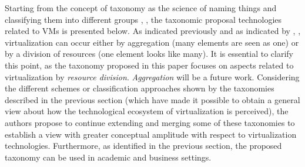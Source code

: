 	
	Starting from the concept of taxonomy as the science of naming things and classifying them into different groups \cite{CambridgeDictionary2018}, \cite{Chi2000}, the taxonomic proposal technologies related to VMs is presented below. As indicated previously and as indicated by \cite{Chiueh2005}, \cite{Hoopes2009}, virtualization can occur either by aggregation (many elements are seen as one) or by a division of resources (one element looks like many). It is essential to clarify this point, as the taxonomy proposed in this paper focuses on aspects related to virtualization by \textit{resource division}. \textit{Aggregation} will be a future work. Considering the different schemes or classification approaches shown by the taxonomies described in the previous section (which have made it possible to obtain a general view about how the technological ecosystem of virtualization is perceived), the authors propose to continue extending and merging some of these taxonomies to establish a view with greater conceptual amplitude with respect to virtualization technologies. Furthermore, as identified in the previous section, the proposed taxonomy can be used in academic and business settings.
	
	
